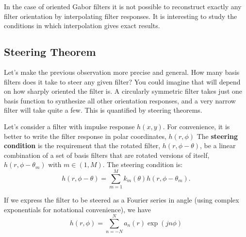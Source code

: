 
In the case of oriented Gabor filters it is not possible to reconstruct exactly any filter orientation by interpolating filter responses. It is interesting to study the conditions in which interpolation gives exact results.

\subsection{Steering Theorem}

Let's make the previous observation more precise and general.  How many basis filters does it take to steer any given
filter?  You could imagine that will depend on how sharply oriented the filter is.  A circularly symmetric filter takes just one basis function
to synthesize all other orientation responses, and a very narrow filter will take quite a few.  This is quantified by steering
theorems.

Let's consider a filter with impulse response $h(x,y)$. For convenience, it is better to write the filter response in polar coordinates, $h(r,\phi)$
The {\bf steering condition} is the requirement that the rotated
filter, $h(r,\phi - \theta)$, be a linear combination of a set of basis filters that are rotated versions of itself, $h(r,\phi - \theta_m)$ with $m \in (1,M)$. The steering condition is:
\begin{equation}
	h(r,\phi - \theta) = \sum_{m=1}^{M} k_{m}(\theta) h(r,\phi - \theta_m) .
	\label{eq:steeringcondition}
\end{equation}

If we express the filter to be steered as a Fourier series in angle (using complex exponentials for notational convenience), we have
\begin{equation}
	h(r,\phi) = \sum_{n=-N}^{N} a_n(r) \exp \left( j n \phi \right)
	\label{eq:fourierseriesinangle}
\end{equation}

